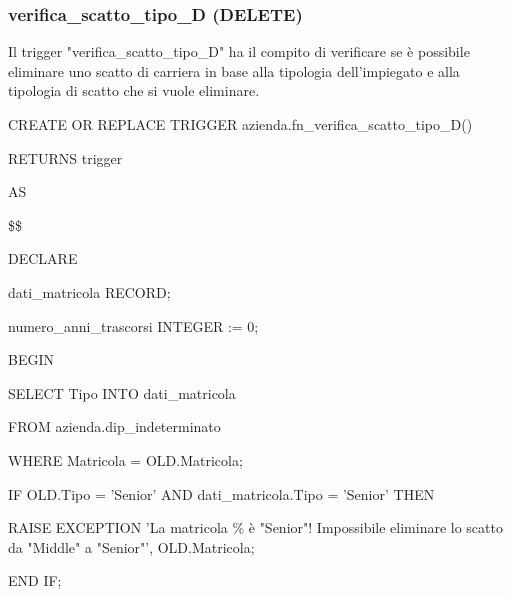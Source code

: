        \subsubsection{verifica\_scatto\_tipo\_D (DELETE)}
        Il trigger "verifica\_scatto\_tipo\_D" ha il compito di verificare se è possibile eliminare uno scatto di carriera in base alla tipologia dell'impiegato e alla tipologia di scatto che si vuole eliminare. 
        \ttfamily
            \begin{flushleft}
                \begin{description}
                    \item CREATE OR REPLACE TRIGGER azienda.fn\_verifica\_scatto\_tipo\_D()  
                    \item RETURNS trigger
                    \item AS
                    \item \$\$
                    \item DECLARE
                    \begin{description}
                        \item dati\_matricola RECORD;
                        \item numero\_anni\_trascorsi INTEGER := 0;
                    \end{description}
                    \item BEGIN 
                    \begin{description}
                        \item SELECT Tipo INTO dati\_matricola
                        \item FROM azienda.dip\_indeterminato
                        \item WHERE Matricola = OLD.Matricola;
                        
                        \vspace{0.5cm}

                        \item IF OLD.Tipo = 'Senior' AND dati\_matricola.Tipo = 'Senior' THEN
                        \begin{description}
                            \item RAISE EXCEPTION 'La matricola \% è "Senior"! Impossibile eliminare lo scatto da "Middle" a "Senior"', OLD.Matricola;
                        \end{description}
                        \item END IF;


\end{description}
\end{description}
\end{flushleft}
